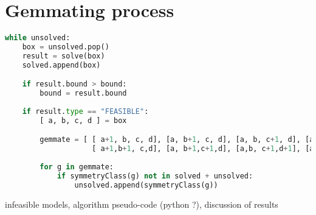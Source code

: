\section{Gemmating process}
\label{sec:gemmating}


\begin{lstlisting}[language = Python,
  basicstyle=\ttfamily\scriptsize,keywordstyle=\color{red},backgroundcolor=\color{white}]
while unsolved:
    box = unsolved.pop()
    result = solve(box)
    solved.append(box)

    if result.bound > bound:
        bound = result.bound
        
    if result.type == "FEASIBLE":
        [ a, b, c, d ] = box

        gemmate = [ [ a+1, b, c, d], [a, b+1, c, d], [a, b, c+1, d], [a, b, c, d+1],
                    [ a+1,b+1, c,d], [a, b+1,c+1,d], [a,b, c+1,d+1], [a+1,b,c, d+1] ]
                    
        for g in gemmate:
            if symmetryClass(g) not in solved + unsolved:
                unsolved.append(symmetryClass(g))
\end{lstlisting}

  infeasible models, 
  algorithm pseudo-code (python ?),
  discussion of results

